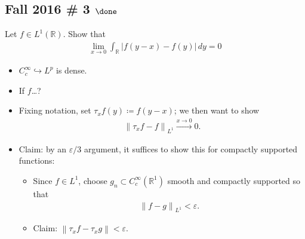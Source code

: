 \hypertarget{fall-2016-3-done}{%
\subsection{\texorpdfstring{Fall 2016 \# 3
\(\done\)}{Fall 2016 \# 3 \textbackslash done}}\label{fall-2016-3-done}}

Let \(f\in L^1({\mathbb{R}})\). Show that
\begin{align*}
\lim _{x \to 0} \int _{{\mathbb{R}}} {\left\lvert {f(y-x)-f(y)} \right\rvert} \, dy = 0
\end{align*}

\begin{solution}

\hfill

\begin{concept}

\hfill

\begin{itemize}
\tightlist
\item
  \(C_c^\infty \hookrightarrow L^p\) is dense.
\item
  If \(f\)\ldots?
\end{itemize}

\end{concept}

\begin{itemize}
\tightlist
\item
  Fixing notation, set \(\tau_x f(y) \coloneqq f(y-x)\); we then want to
  show
  \begin{align*}  
  {\left\lVert {\tau_x f -f} \right\rVert}_{L^1} \overset{x\to 0}\to 0
  .\end{align*}
\item
  Claim: by an \(\varepsilon/3\) argument, it suffices to show this for
  compactly supported functions:

  \begin{itemize}
  \tightlist
  \item
    Since \(f\in L^1\), choose \(g_n\subset C_c^\infty({\mathbb{R}}^1)\)
    smooth and compactly supported so that
    \begin{align*}{\left\lVert {f-g} \right\rVert}_{L^1} < \varepsilon.\end{align*}
  \item
    Claim:
    \({\left\lVert {\tau_x f - \tau_x g} \right\rVert} < \varepsilon\).


\end{itemize}
\end{itemize}
\end{solution}
